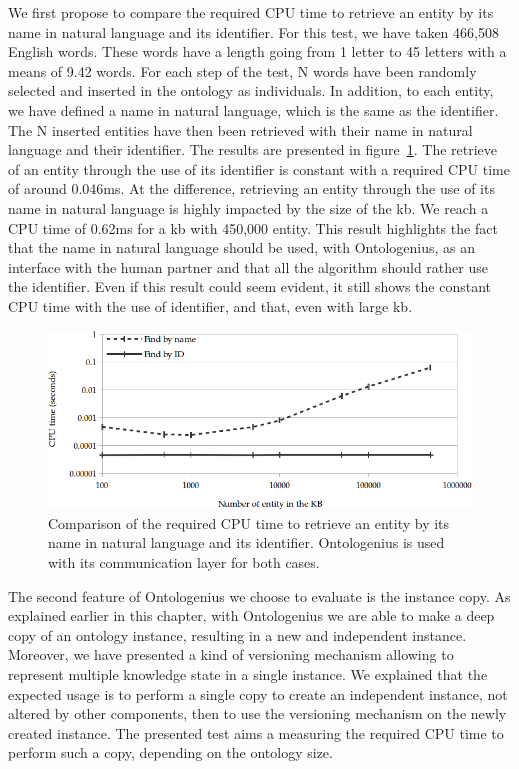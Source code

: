 We first propose to compare the required CPU time to retrieve an entity by its name in natural language and its identifier. For this test, we have taken 466,508 English words. These words have a length going from 1 letter to 45 letters with a means of  9.42 words. For each step of the test, N words have been randomly selected and inserted in the ontology as individuals. In addition, to each entity, we have defined a name in natural language, which is the same as the identifier. The N inserted entities have then been retrieved with their name in natural language and their identifier. The results are presented in figure~\ref{fig:chap2_extra_find}. The retrieve of an entity through the use of its identifier is constant with a required CPU time of around 0.046ms. At the difference, retrieving an entity through the use of its name in natural language is highly impacted by the size of the \acrshort{kb}. We reach a CPU time of 0.62ms for a \acrshort{kb} with 450,000 entity. This result highlights the fact that the name in natural language should be used, with Ontologenius, as an interface with the human partner and that all the algorithm should rather use the identifier. Even if this result could seem evident, it still shows the constant CPU time with the use of identifier, and that, even with large \acrshort{kb}.

\begin{figure}[ht!]
\centering
\includegraphics[width=\textwidth]{figures/chapter2/extra_tests/find.png}
\caption{\label{fig:chap2_extra_find} Comparison of the required CPU time to retrieve an entity by its name in natural language and its identifier. Ontologenius is used with its communication layer for both cases.}
\end{figure}

The second feature of Ontologenius we choose to evaluate is the instance copy. As explained earlier in this chapter, with Ontologenius we are able to make a deep copy of an ontology instance, resulting in a new and independent instance. Moreover, we have presented a kind of versioning mechanism allowing to represent multiple knowledge state in a single instance. We explained that the expected usage is to perform a single copy to create an independent instance, not altered by other components, then to use the versioning mechanism on the newly created instance. The presented test aims a measuring the required CPU time to perform such a copy, depending on the ontology size.

